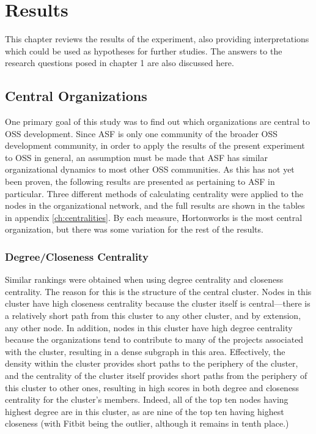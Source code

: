 \chapter{Results}
This chapter reviews the results of the experiment, also providing interpretations which could be used as hypotheses for further studies. The answers to the research questions posed in chapter 1 are also discussed here.


\section{Central Organizations}
One primary goal of this study was to find out which organizations are central to OSS development. Since ASF is only one community of the broader OSS development community, in order to apply the results of the present experiment to OSS in general, an assumption must be made that ASF has similar organizational dynamics to most other OSS communities. As this has not yet been proven, the following results are presented as pertaining to ASF in particular. Three different methods of calculating centrality were applied to the nodes in the organizational network, and the full results are shown in the tables in appendix \ref{ch:centralities}. By each measure, Hortonworks is the most central organization, but there was some variation for the rest of the results.

\subsection{Degree/Closeness Centrality}
Similar rankings were obtained when using degree centrality and closeness centrality. The reason for this is the structure of the central cluster. Nodes in this cluster have high closeness centrality because the cluster itself is central---there is a relatively short path from this cluster to any other cluster, and by extension, any other node. In addition, nodes in this cluster have high degree centrality because the organizations tend to contribute to many of the projects associated with the cluster, resulting in a dense subgraph in this area. Effectively, the density within the cluster provides short paths to the periphery of the cluster, and the centrality of the cluster itself provides short paths from the periphery of this cluster to other ones, resulting in high scores in both degree and closeness centrality for the cluster's members. Indeed, all of the top ten nodes having highest degree are in this cluster, as are nine of the top ten having highest closeness (with Fitbit being the outlier, although it remains in tenth place.)

